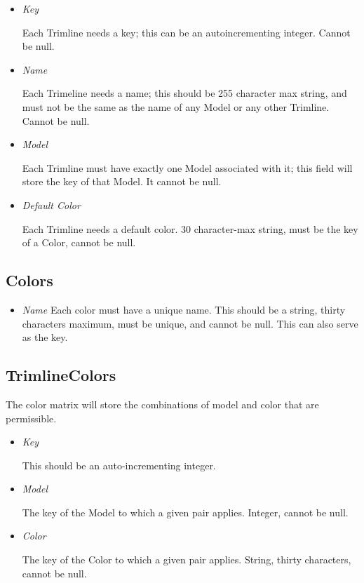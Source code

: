 \documentclass{article}
\begin{document}
\begin{itemize}
	\item \emph{Key}
	
	Each Trimline needs a key; this can be an autoincrementing integer. Cannot be null.
	
	\item \emph{Name}
	
	Each Trimeline needs a name; this should be 255 character max string, and must not be the same as the name of any Model or any other Trimline.  Cannot be null.

	\item \emph{Model}
	
	Each Trimline must have exactly one Model associated with it; this field will store the key of that Model.  It cannot be null.
	
	\item \emph{Default Color}
	
	Each Trimline needs a default color.  30 character-max string, must be the key of a Color, cannot be null.

\end{itemize}

\subsection*{Colors}

\begin{itemize}
	\item \emph	{Name}
		Each color must have a unique name.  This should be a string, thirty characters maximum, must be unique, and cannot be null.  This can also serve as the key.
		
\end{itemize}

\subsection*{TrimlineColors}

The color matrix will store the combinations of model and color that are permissible.

\begin{itemize}

\item \emph{Key}

	This should be an auto-incrementing integer.
	
\item \emph{Model}

	The key of the Model to which a given pair applies.  Integer, cannot be null.
	
\item \emph{Color}

	The key of the Color to which a given pair applies. String, thirty characters, cannot be null.

\end{itemize}
\end{document}
